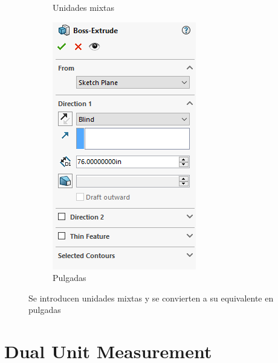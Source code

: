 \documentclass{report}
\begin{document}
\begin{figure}[H]
\begin{subfigure}[b]{0.45\textwidth}
		\caption{Unidades mixtas}
		\label{fig:solidworksfeetin01}
	\end{subfigure}
	\begin{subfigure}[b]{0.45\textwidth}
		\includegraphics[width=\textwidth]{Imagenes/solidworks_feetin02}
		\caption{Pulgadas}
		\label{fig:solidworksfeetin02}
	\end{subfigure}
	\caption{Se introducen unidades mixtas y se convierten a su equivalente en pulgadas}
\end{figure}

\chapter{Dual Unit Measurement}
\end{document}
